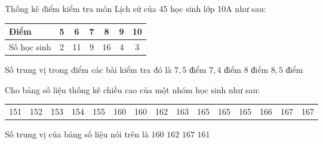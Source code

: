 \begin{ex}
	Thống kê điểm kiểm tra môn Lịch sử của 45 học sinh lớp 10A như sau:
	\begin{center}
	\begin{tabular}{|l|c|c|c|c|c|c|}
		\hline
		Điểm & 5 & 6 & 7 & 8 & 9 & 10 \\
		\hline
		Số học sinh & 2 & 11 & 9 & 16 & 4 & 3 \\
		\hline
	\end{tabular}
	\end{center}
	Số trung vị trong điểm các bài kiểm tra đó là
	\choice
	{$7{,}5\text{ điểm}$}
	{$7{,}4\text{ điểm}$}
	{\True $8\text{ điểm}$}
	{$8{,}5\text{ điểm}$}
\end{ex}

\begin{ex}
	Cho bảng số liệu thống kê chiều cao của một nhóm học sinh như sau:
	\begin{center}
	\begin{tabular}{ccccccccccccccc}
		151 & 152 & 153 & 154 & 155 & 160 & 160 & 162 & 163 & 165 & 165 & 165 & 166 & 167 & 167
	\end{tabular}
	\end{center}
	Số trung vị của bảng số liệu nói trên là
	\choice
	{$160$}
	{\True $162$}
	{$167$}
	{$161$}
\end{ex}

